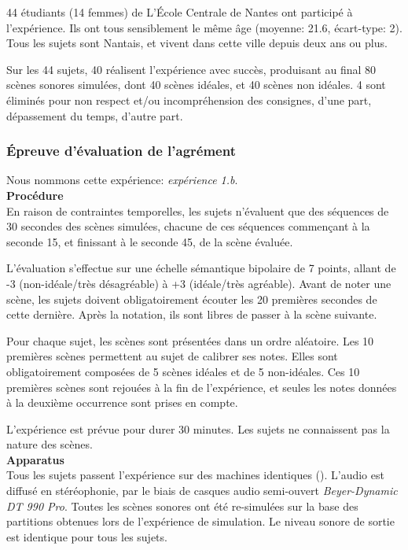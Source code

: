 44 étudiants (14 femmes) de L’École Centrale de Nantes ont participé à l'expérience. Ils ont tous sensiblement le même âge (moyenne: 21.6, écart-type: 2). Tous les sujets sont Nantais, et vivent dans cette ville depuis deux ans ou plus.

Sur les 44 sujets, 40 réalisent l'expérience avec succès, produisant au final 80 scènes sonores simulées, dont 40 scènes idéales, et 40 scènes non idéales. 4 sont éliminés pour non respect et/ou incompréhension des consignes, d'une part, dépassement du temps, d'autre part.



\subsubsection{Épreuve d'évaluation de l'agrément}
\label{sec:ch5_planExpEvaA}

Nous nommons cette expérience: \emph{expérience 1.b}. \\

\textbf{Procédure} \\

En raison de contraintes temporelles, les sujets n'évaluent que des séquences de 30 secondes des scènes simulées, chacune de ces séquences commençant à la seconde 15, et finissant à le seconde 45, de la scène évaluée.

L'évaluation s'effectue sur une échelle sémantique bipolaire de 7 points, allant de -3 (non-idéale/très désagréable) à +3 (idéale/très agréable). Avant de noter une scène, les sujets doivent obligatoirement écouter les 20 premières secondes de cette dernière. Après la notation, ils sont libres de passer à la scène suivante.

Pour chaque sujet, les scènes sont présentées dans un ordre aléatoire. Les 10 premières scènes permettent au sujet de calibrer ses notes. Elles sont obligatoirement composées de 5 scènes idéales et de 5 non-idéales. Ces 10 premières scènes sont rejouées à la fin de l'expérience, et seules les notes données à la deuxième occurrence sont prises en compte. 

L'expérience est prévue pour durer 30 minutes. Les sujets ne connaissent pas la nature des scènes.\\

\textbf{Apparatus} \\

Tous les sujets passent l'expérience sur des machines identiques (). L'audio est diffusé en stéréophonie, par le biais de casques audio semi-ouvert \emph{Beyer-Dynamic DT 990 Pro}. Toutes les scènes sonores ont été re-simulées sur la base des partitions obtenues lors de l'expérience de simulation. Le niveau sonore de sortie est identique pour tous les sujets.

